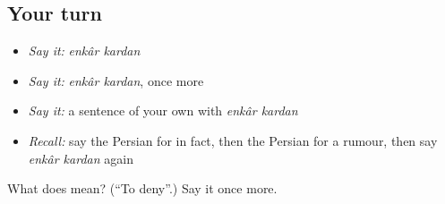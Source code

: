 \subsection*{Your turn}
\begin{itemize}
\raggedright
  \item \emph{Say it:} \emph{enkâr kardan}
  \item \emph{Say it:} \emph{enkâr kardan}, once more
  \item \emph{Say it:} a sentence of your own with \emph{enkâr kardan}
  \item \emph{Recall:} say the Persian for in fact, then the Persian for a rumour, then say \emph{enkâr kardan} again
\end{itemize}

\begin{tcolorbox}[breakable,colback=teal!4,colframe=teal!35!black,title={Before you move on}]
What does   mean? (\textquotedblleft{}To deny\textquotedblright{}.) Say it once more.
\end{tcolorbox}
